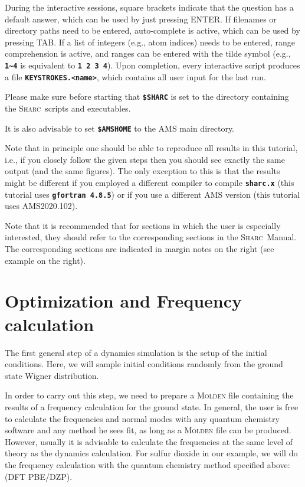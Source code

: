 \documentclass[a4paper,11pt,DIV=15,openany]{scrbook}
\makeatletter
\newcommand{\refermanual}[2][rectangle,draw=B,thick,fill=black!5,inner sep=1pt,outer sep=0pt,rounded corners]{\marginpar{\tikz[baseline=(current bounding box.north)]\node at (0,0) [#1]{\begin{tabular}{@{}l@{}}See\\ section\\ \ref*{#2}\\ (p. \pageref*{#2})\\ in the\\ manual.\end{tabular}};}}
\newcommand{\sharc}{\textsc{Sharc}}
\newcommand{\ttt}[1]{\textbf{\texttt{#1}}}
\makeatother
\begin{document}
\normalsize
During the interactive sessions, square brackets indicate that the question has a default answer, which can be used by just pressing ENTER. 
If filenames or directory paths need to be entered, auto-complete is active, which can be used by pressing TAB. 
If a list of integers (e.g., atom indices) needs to be entered, range comprehension is active, and ranges can be entered with the tilde symbol (e.g., \ttt{1\textasciitilde 4} is equivalent to \ttt{1 2 3 4}).
Upon completion, every interactive script produces a file \ttt{KEYSTROKES.<name>}, which contains all user input for the last run.

\begin{shaded}
  Please make sure before starting that \ttt{\$SHARC} is set to the directory containing the \sharc\ scripts and executables.

  It is also advisable to set \ttt{\$AMSHOME} to the \textsc{AMS} main directory.
\end{shaded}

Note that in principle one should be able to reproduce all results in this tutorial, i.e., if you closely follow the given steps then you should see exactly the same output (and the same figures).
The only exception to this is that the results might be different if you employed a different compiler to compile \ttt{sharc.x} (this tutorial uses \ttt{gfortran 4.8.5}) or if you use a different \textsc{AMS} version (this tutorial uses \textsc{AMS2020.102}).

\refermanual{m-chap:aux}
Note that it is recommended that for sections in which the user is especially interested, they should refer to the corresponding sections in the \sharc\ Manual.
The corresponding sections are indicated in margin notes on the right (see example on the right).



\clearpage
\section{Optimization and Frequency calculation}\label{tut:optfreq}

The first general step of a dynamics simulation is the setup of the initial conditions.
Here, we will sample initial conditions randomly from the ground state Wigner distribution.

In order to carry out this step, we need to prepare a \textsc{Molden} file containing the results of a frequency calculation for the ground state.
In general, the user is free to calculate the frequencies and normal modes with any quantum chemistry software and any method he sees fit, as long as a \textsc{Molden} file can be produced. 
However, usually it is advisable to calculate the frequencies at the same level of theory as the dynamics calculation. 
For sulfur dioxide in our example, we will do the frequency calculation with the quantum chemistry method specified above: (DFT PBE/DZP). 
\end{document}
